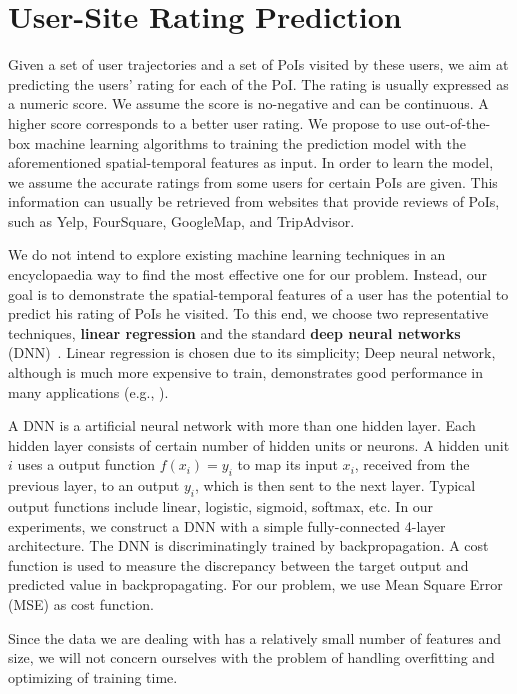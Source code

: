 \section{User-Site Rating Prediction}
\label{sec:prediction}

Given a set of user trajectories and a set of PoIs visited by these users, we aim at predicting the users' rating for each of the PoI. The rating is usually expressed as a numeric score. We assume the score is no-negative and can be continuous. A higher score corresponds to a better user rating. We propose to use out-of-the-box machine learning algorithms to training the prediction model with the aforementioned spatial-temporal features as input. In order to learn the model, we assume the accurate ratings from some users for certain PoIs are given. This information can usually be retrieved from websites that provide reviews of PoIs, such as Yelp, FourSquare, GoogleMap, and TripAdvisor. 

We do not intend to explore existing machine learning techniques in an encyclopaedia way to find the most effective one for our problem. Instead, our goal is to demonstrate the spatial-temporal features of a user has the potential to predict his rating of PoIs he visited. To this end, we choose two representative techniques, \textbf{linear regression} and the standard \textbf{deep neural networks} (DNN)~\cite{schmidhuber2015deep}. Linear regression is chosen due to its simplicity; Deep neural network, although is much more expensive to train, demonstrates good performance in many applications (e.g., \cite{ruiz2013innovative, hinton2012deep, krizhevsky2012imagenet}).

A DNN is a artificial neural network with more than one hidden layer. Each hidden layer consists of certain number of hidden units or neurons. A hidden unit $i$ uses a output function $f(x_i) = y_i$ to map its input $x_i$, received from the previous layer, to an output $y_i$, which is then sent to the next layer. Typical output functions include linear, logistic, sigmoid, softmax, etc. In our experiments, we construct a DNN with a simple fully-connected 4-layer architecture. The DNN is discriminatingly trained by backpropagation. A cost function is used to measure the discrepancy between the target output and predicted value in backpropagating. For our problem, we use Mean Square Error (MSE) as cost function. 

Since the data we are dealing with has a relatively small number of features and size, we will not concern ourselves with the problem of handling overfitting and optimizing of training time.